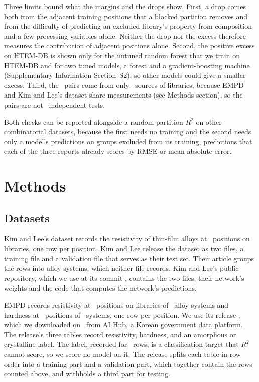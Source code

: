 \documentclass[11pt]{article}
\begin{document}
Three limits bound what the margins and the drops show. First, a drop comes both from
the adjacent training positions that a blocked partition removes and from the
difficulty of predicting an excluded library's property from composition and a
few processing variables alone.
Neither the drop nor the excess therefore measures the contribution of
adjacent positions alone. Second, the positive excess on HTEM-DB is shown only for
the untuned random forest that we train on HTEM-DB and for two tuned models, a
forest and a gradient-boosting machine (Supplementary Information Section~S2), so other models could give a smaller excess. Third, the
\randomPairs\ pairs come from only
\programCount\ sources of libraries, because EMPD and Kim and Lee's dataset
share measurements (see Methods section), so the pairs are not \randomPairs\
independent tests.

\label{par:conclusion}
Both checks can be reported alongside a random-partition $R^2$ on other
combinatorial datasets, because the first needs no training and the second
needs only a model's predictions on groups excluded from its training,
predictions that each of the three reports already scores by RMSE or mean
absolute error.

\section*{Methods}
\label{sec:methods}

\subsection*{Datasets}
\label{sec:datasets}

Kim and Lee's dataset records the resistivity of thin-film alloys at
\npjDatasetRows\ positions on libraries, one row per
position.\cite{kim2025descriptors} Kim and Lee release the dataset as
two files, a training file and a validation file that serves as their test
set. Their article groups the rows into
alloy systems, which neither file records. Kim and Lee's public repository, which we use at its commit \npjCommit,
contains the two files, their network's weights and the code that computes the
network's predictions.

EMPD records resistivity at \empdResRows\ positions on libraries of
\empdResSystems\ alloy systems and hardness at \empdHardRows\ positions of
\empdHardSystems\ systems, one row per position.\cite{aihubMaterials} We use
its release \empdRelease, which we downloaded on \empdRetrieved\ from AI Hub, a
Korean government data platform. The release's three tables record resistivity, hardness, and an
amorphous or crystalline label. The label, recorded for \empdAmorphousRows\ rows, is a classification target that $R^2$
cannot score, so we score no model on it. The release splits each table in row order into a training part
and a validation part, which together contain the rows counted above, and
withholds a third part for testing.
\end{document}
